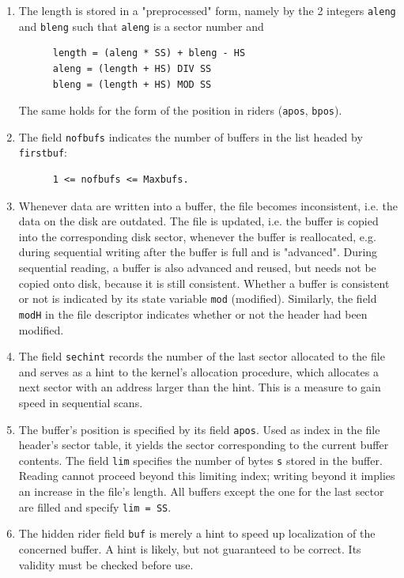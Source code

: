 \begin{enumerate}
  \item The length is stored in a "preprocessed" form, namely by the 2 integers \verb|aleng| and
    \verb|bleng| such that \verb|aleng| is a sector number and
    \begin{verbatim}
      length = (aleng * SS) + bleng - HS
      aleng = (length + HS) DIV SS
      bleng = (length + HS) MOD SS
    \end{verbatim}
    The same holds for the form of the position in riders (\verb|apos|, \verb|bpos|).
  \item The field \verb|nofbufs| indicates the number of buffers in the list headed by \verb|firstbuf|:
    \begin{verbatim}
      1 <= nofbufs <= Maxbufs.
    \end{verbatim}
  \item Whenever data are written into a buffer, the file becomes inconsistent, i.e. the data on the
    disk are outdated. The file is updated, i.e. the buffer is copied into the corresponding disk
    sector, whenever the buffer is reallocated, e.g. during sequential writing after the buffer is full
    and is "advanced". During sequential reading, a buffer is also advanced and reused, but needs not be
    copied onto disk, because it is still consistent. Whether a buffer is consistent or not is indicated
    by its state variable \verb|mod| (modified). Similarly, the field \verb|modH| in the file descriptor
    indicates whether or not the header had been modified.
  \item The field \verb|sechint| records the number of the last sector allocated to the file and serves
    as a hint to the kernel's allocation procedure, which allocates a next sector with an address larger
    than the hint. This is a measure to gain speed in sequential scans.
  \item The buffer's position is specified by its field \verb|apos|. Used as index in the file header's
    sector table, it yields the sector corresponding to the current buffer contents. The field
    \verb|lim| specifies the number of bytes \verb|s| stored in the buffer. Reading cannot proceed
    beyond this limiting index; writing beyond it implies an increase in the file's length. All buffers
    except the one for the last sector are filled and specify \verb|lim = SS|.
  \item The hidden rider field \verb|buf| is merely a hint to speed up localization of the concerned
    buffer. A hint is likely, but not guaranteed to be correct. Its validity must be checked before use.

\end{enumerate}
